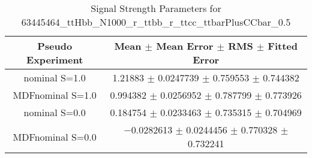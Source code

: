 \begin{table}
\centering
\caption{Signal Strength Parameters for 63445464\_ttHbb\_N1000\_r\_ttbb\_r\_ttcc\_ttbarPlusCCbar\_0.5}
\begin{tabular}{cc}
\toprule
Pseudo Experiment & Mean $\pm$ Mean Error $\pm$ RMS $\pm$ Fitted Error\\
\midrule
nominal S=1.0 & \num{1.21883} $\pm$ \num{0.0247739} $\pm$ \num{0.759553} $\pm$ \num{0.744382}\\
MDFnominal S=1.0 & \num{0.994382} $\pm$ \num{0.0256952} $\pm$ \num{0.787799} $\pm$ \num{0.773926}\\
nominal S=0.0 & \num{0.184754} $\pm$ \num{0.0233463} $\pm$ \num{0.735315} $\pm$ \num{0.704969}\\
MDFnominal S=0.0 & \num{-0.0282613} $\pm$ \num{0.0244456} $\pm$ \num{0.770328} $\pm$ \num{0.732241}\\
\bottomrule
\end{tabular}
\end{table}